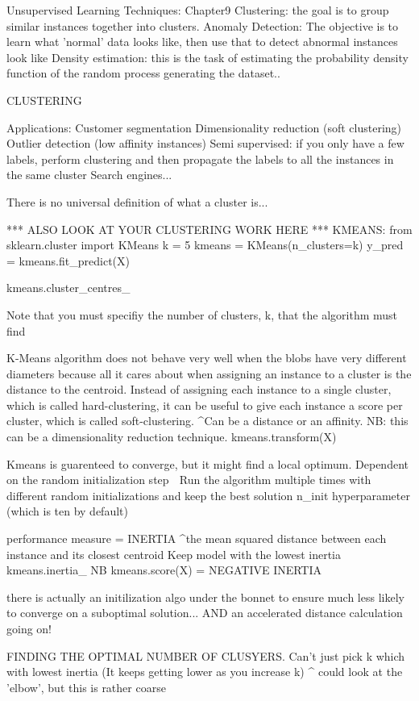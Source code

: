 Unsupervised Learning Techniques: Chapter9
Clustering: the goal is to group similar instances together into clusters.
Anomaly Detection: The objective is to learn what 'normal' data looks like,
then use that to detect abnormal instances look like
Density estimation: this is the task of estimating the probability density function of the random process generating the dataset..

CLUSTERING

Applications:
Customer segmentation
Dimensionality reduction (soft clustering)
Outlier detection (low affinity instances)
Semi supervised: if you only have a few labels, perform clustering and then propagate the labels to all the instances in the same cluster
Search engines...

There is no universal definition of what a cluster is...

*** ALSO LOOK AT YOUR CLUSTERING WORK HERE ***
KMEANS:
from sklearn.cluster import KMeans
k = 5
kmeans = KMeans(n_clusters=k)
y_pred = kmeans.fit_predict(X)

kmeans.cluster_centres_

Note that you must specifiy the number of clusters, k, that the algorithm must find

K-Means algorithm does not behave very well when the blobs have very different diameters because all it cares about
when assigning an instance to a cluster is the distance to the centroid.
Instead of assigning each instance to a single cluster, which is called hard-clustering,
it can be useful to give each instance a score per cluster, which is called soft-clustering.
^Can be a distance or an affinity. NB: this can be a dimensionality reduction technique.
kmeans.transform(X)

Kmeans is guarenteed to converge, but it might find a local optimum.
Dependent on the random initialization step
^^^ Run the algorithm multiple times with different random initializations and keep the best solution
n_init hyperparameter (which is ten by default)

performance measure = INERTIA
^the mean squared distance between each instance and its closest centroid
Keep model with the lowest inertia
kmeans.inertia_
NB kmeans.score(X) = NEGATIVE INERTIA

there is actually an initilization algo under the bonnet
to ensure much less likely to converge on a suboptimal solution...
AND an accelerated distance calculation going on!

FINDING THE OPTIMAL NUMBER OF CLUSYERS.
Can't just pick k which with lowest inertia
(It keeps getting lower as you increase k)
^ could look at the 'elbow', but this is rather coarse

